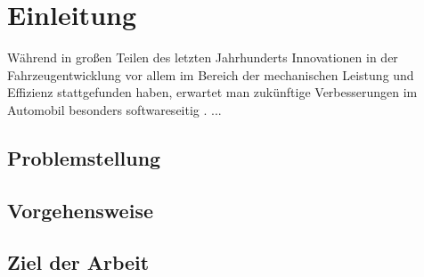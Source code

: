 \chapter{Einleitung}
Während in großen Teilen des letzten Jahrhunderts Innovationen in der Fahrzeugentwicklung vor allem im Bereich der mechanischen Leistung und Effizienz stattgefunden haben, erwartet man zukünftige Verbesserungen im Automobil besonders softwareseitig \cite{Staron2021}. ... 
\section{Problemstellung}

\section{Vorgehensweise}
\section{Ziel der Arbeit}